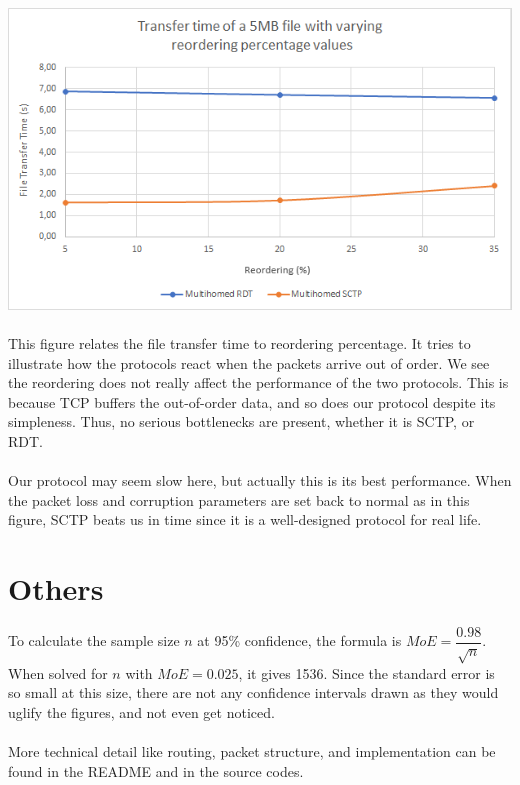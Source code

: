 \documentclass[12pt]{article}
\begin{document}
\includegraphics[scale=0.8]{graph3.png}
\\\\
This figure relates the file transfer time to reordering percentage. It tries to illustrate how the protocols react when the packets arrive out of order. We see the reordering does not really affect the performance of the two protocols. This is because TCP buffers the out-of-order data, and so does our protocol despite its simpleness. Thus, no serious bottlenecks are present, whether it is SCTP, or RDT.\\\\
Our protocol may seem slow here, but actually this is its best performance. When the packet loss and corruption parameters are set back to normal as in this figure, SCTP beats us in time since it is a well-designed protocol for real life.

\section*{Others}
To calculate the sample size $n$ at 95\% confidence, the formula is $MoE = \dfrac{0.98}{\sqrt{n}}$. When solved for $n$ with $MoE=0.025$, it gives 1536. Since the standard error is so small at this size, there are not any confidence intervals drawn as they would uglify the figures, and not even get noticed.\\\\
More technical detail like routing, packet structure, and implementation can be found in the README and in the source codes.
\end{document}
